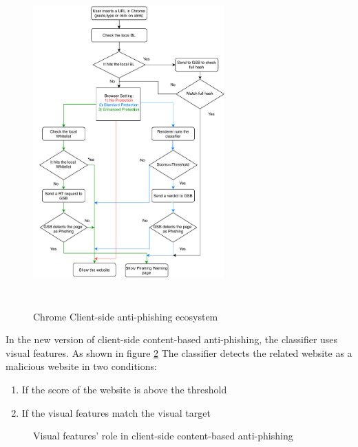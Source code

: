 \documentclass[letterpaper,twocolumn,10pt]{article}
\begin{document}
\begin{figure}[h!]
\centering
\includegraphics[height=5.0in, width=2.9in]{chrome-ecosystem.pdf}
\caption{Chrome Client-side anti-phishing ecosystem}
\label{fig:Chrome client side anti-phishing flowchart}
\end{figure} 

In the new version of client-side content-based anti-phishing, the classifier uses visual features. As shown in figure \ref{fig:visual features} The classifier detects the related website as a malicious website in two conditions:
\begin{enumerate}
    \item If the score of the website is above the threshold
    \item If the visual features match the visual target
\end{enumerate}

 \begin{figure}[h!]
\centering
{}
\caption{Visual features' role in client-side content-based anti-phishing}
\label{fig:visual features}
\end{figure} 
\end{document}
